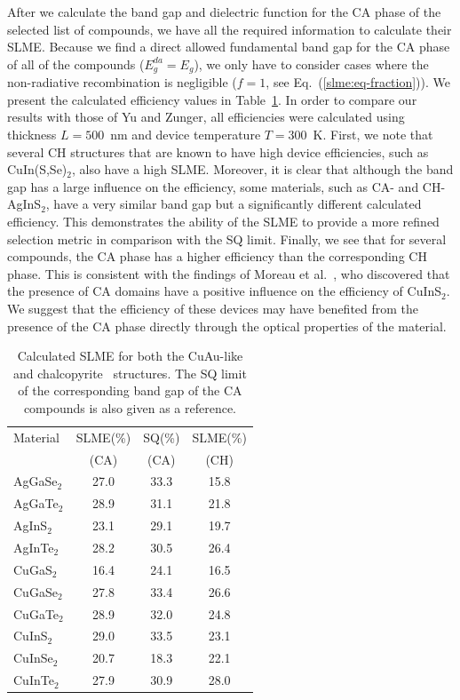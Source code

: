 \begin{refsection}
After we calculate the band gap and dielectric function for the CA phase of 
the selected list of compounds, we have all the required information to 
calculate their SLME. Because we find a direct allowed fundamental band gap 
for the CA phase of all of the compounds ($E_g^{da}=E_g$), we only have to 
consider cases where the non-radiative recombination is negligible ($f = 1$, 
see Eq.~(\ref{slme:eq-fraction})). We present the calculated efficiency values 
in Table~\ref{slme:tab-SLME}. In order to compare our results with those of Yu 
and Zunger, all efficiencies were calculated using thickness $L = 
500$~\si{\nano\meter} and device temperature \mbox{$T = 300$~\si{\kelvin}}. 
First, we note that several CH structures that are known to have high device 
efficiencies, such as CuIn(S,Se)$_{2}$, also have a high SLME. Moreover, it is 
clear that although the band gap has a large influence on the efficiency, some 
materials, such as CA- and \mbox{CH-AgInS$_2$}, have a very similar band gap 
but a significantly different calculated efficiency. This demonstrates the 
ability of the SLME to provide a more refined selection metric in comparison 
with the SQ limit. Finally, we see that for several compounds, the CA phase 
has a higher efficiency than the corresponding CH phase. This is consistent 
with the findings of Moreau et al.~\cite{Moreau2015}, who discovered that the 
presence of CA domains have a positive influence on the efficiency of 
CuInS$_2$. We suggest that the efficiency of these devices may have benefited 
from the presence of the CA phase directly through the optical properties of 
the material. 
 
\begin{table}[htbp] 
\renewcommand{\arraystretch}{1.3} 
\centering 
\caption{Calculated SLME for both the \mbox{CuAu-like} and 
chalcopyrite~\cite{Yu2012} structures. The SQ limit of the corresponding band 
gap of the CA compounds is also given as a reference.} 
\label{slme:tab-SLME} 
\begin{tabular}{l@{\hskip 2em}c@{\hskip 1em}c@{\hskip 1em}c} 
\hline 
Material & SLME(\%) & SQ(\%) & SLME(\%)\\ 
		 &  (CA)	&  (CA) &  (CH)	 \\\hline 
AgGaSe$_2$ & 27.0 & 33.3 & 15.8 \\ 
AgGaTe$_2$ & 28.9 & 31.1 & 21.8 \\ 
AgInS$_2$  & 23.1 & 29.1 & 19.7 \\ 
AgInTe$_2$ & 28.2 & 30.5 & 26.4 \\ 
CuGaS$_2$  & 16.4 & 24.1 & 16.5 \\ 
CuGaSe$_2$ & 27.8 & 33.4 & 26.6 \\ 
CuGaTe$_2$ & 28.9 & 32.0 & 24.8 \\ 
CuInS$_2$  & 29.0 & 33.5 & 23.1 \\ 
CuInSe$_2$ & 20.7 & 18.3 & 22.1 \\ 
CuInTe$_2$ & 27.9 & 30.9 & 28.0 \\ \hline 
\end{tabular} 
\end{table} 
 

\end{refsection}

